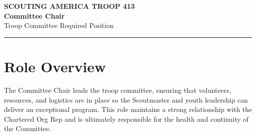 \documentclass[10pt, letterpaper]{article}
\begin{document}
\begin{center}
  {\small\color{scoutgreen}\textbf{SCOUTING AMERICA \textbullet{} TROOP 413}} \\[4pt]
  {\fontsize{20pt}{24pt}\selectfont\bfseries\color{scoutgreen} Committee Chair} \\[4pt]
  {\large\color{accent} Troop Committee \textbullet{} Required Position} \\[4pt]
  \textcolor{accent}{\rule{0.6\linewidth}{1pt}}
\end{center}

\vspace{0.3em}

\section{Role Overview}
The Committee Chair leads the troop committee, ensuring that volunteers, resources, and logistics are in place so the Scoutmaster and youth leadership can deliver an exceptional program. This role maintains a strong relationship with the Chartered Org Rep and is ultimately responsible for the health and continuity of the Committee.

\vspace{0.4em}
\end{document}
